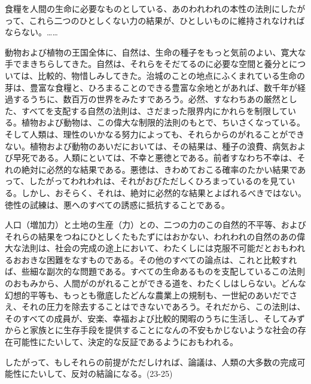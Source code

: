 食糧を人間の生命に必要なものとしている、あのわれわれの本性の法則にしたがって、これら二つのひとしくない力の結果が、ひとしいものに維持されなければならない。……




動物および植物の王国全体に、自然は、生命の種子をもっと気前のよい、寛大な手でまきちらしてきた。自然は、それらをそだてるのに必要な空間と養分とについては、比較的、物惜しみしてきた。治城のことの地点にふくまれている生命の芽は、豊富な食糧と、ひろまることのできる豊富な余地とがあれば、数千年が経過するうちに、数百万の世界をみたすであろう。必然、すなわちあの厳然とした、すべてを支配する自然の法則は、さだまった限界内にかれらを制限している。植物および動物は、この偉大な制限的法則のもとで、ちいさくなっている。そして人類は、理性のいかなる努力によっても、それらからのがれることができない。植物および動物のあいだにおいては、その結果は、種子の浪費、病気および早死である。人類にといては、不幸と悪徳とである。前者すなわち不幸は、それの絶対に必然的な結果である。悪徳は、きわめておこる確率のたかい結果であって、したがってわれわれは、それがおびただしくひろまっているのを見ている。しかし、おそらく、それは、絶対に必然的な結果とよばれるべきではない。徳性の試練は、悪へのすべての誘惑に抵抗することである。


人口（増加力）と土地の生産（力）との、二つの力のこの自然的不平等、およびそれらの結果をつねにひとしくたもたずにはおかない、われわれの自然のあの偉大な法則は、社会の完成の途上において、わたくしには克服不可能だとおもわれるおおきな困難をなすものである。その他のすべての論点は、これと比較すれば、些細な副次的な問題である。すべての生命あるものを支配しているこの法則のおもみから、人間がのがれることができる道を、わたくしはしらない。どんな幻想的平等も、もっとも徹底したどんな農業上の規制も、一世紀のあいだでさえ、それの圧力を除去することはできないであろう。それだから、この法則は、そのすべての成員が、安楽、幸福および比較的閑暇のうちに生活し、そしてみずからと家族とに生存手段を提供することになんの不安もかじないような社会の存在可能性にたいして、決定的な反証であるようにおもわれる。

したがって、もしそれらの前提がただしければ、論議は、人類の大多数の完成可能性にたいして、反対の結論になる。(23-25)



